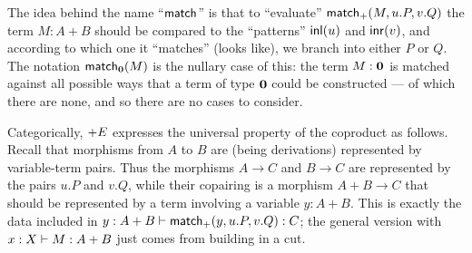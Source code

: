 The idea behind the name ``$\mathsf{match}$'' is that to ``evaluate'' $\mathsf{match}_+(M,u.P,v.Q)$ the term $M:A+B$ should be compared to the ``patterns'' $\mathsf{inl}(u)$ and $\mathsf{inr}(v)$, and according to which one it ``matches'' (looks like), we branch into either $P$ or $Q$.
The notation $\mathsf{match}_{\mathbf{0}}(M)$ is the nullary case of this: the term $M:\mathbf{0}$ is matched against all possible ways that a term of type $\mathbf{0}$ could be constructed --- of which there are none, and so there are no cases to consider.

Categorically, $\mathord{+}E$ expresses the universal property of the coproduct as follows.
Recall that morphisms from $A$ to $B$ are (being derivations) represented by variable-term pairs.
Thus the morphisms $A\to C$ and $B\to C$ are represented by the pairs $u.P$ and $v.Q$, while their copairing is a morphism $A+B\to C$ that should be represented by a term involving a variable $y:A+B$.
This is exactly the data included in $y:A+B\vdash \mathsf{match}_+(y,u.P,v.Q):C$; the general version with $x:X\vdash M:A+B$ just comes from building in a cut.



